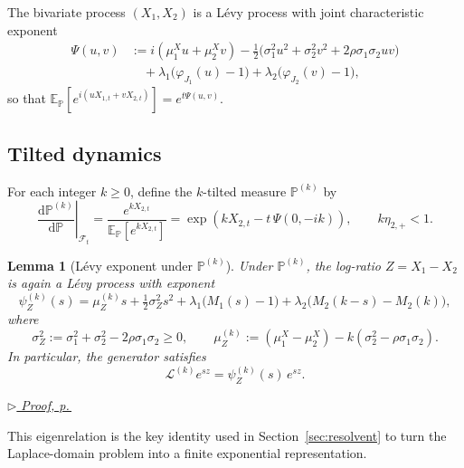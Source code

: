 \documentclass[11pt]{article}
\newcommand{\proofref}[1]{%
  \par\noindent\hfill{\small\itshape\hyperref[#1]{$\triangleright$ Proof, p.\,\pageref{#1}}}}
\newcommand{\E}{\mathbb{E}}
\renewcommand{\P}{\mathbb{P}}
\newcommand{\diff}{\mathrm{d}}
\newcommand{\F}{\mathcal{F}}
\theoremstyle{plain}
\newtheorem{lemma}[theorem]{Lemma}
\theoremstyle{definition}
\theoremstyle{remark}
\begin{document}
The bivariate process $(X_1,X_2)$ is a L\'evy process with joint characteristic exponent
\begin{equation}\label{eq:Psi}
\begin{aligned}
\Psi(u,v)
&:= i(\mu_1^X u+\mu_2^X v)
-\tfrac12\Big(\sigma_1^2u^2+\sigma_2^2v^2+2\rho\sigma_1\sigma_2uv\Big)\\
&\quad +\lambda_1\big(\varphi_{J_1}(u)-1\big)
+\lambda_2\big(\varphi_{J_2}(v)-1\big),
\end{aligned}
\end{equation}
so that $\E_\P[e^{i(uX_{1,t}+vX_{2,t})}]=e^{t\Psi(u,v)}$.

\subsection{Tilted dynamics}\label{sec:tilted}

For each integer $k\ge 0$, define the $k$-tilted measure $\P^{(k)}$ by
\[
\left.\frac{\diff\P^{(k)}}{\diff\P}\right|_{\F_t}
=
\frac{e^{kX_{2,t}}}{\E_{\P}[e^{kX_{2,t}}]}
=
\exp\!\left(kX_{2,t}-t\,\Psi(0,-ik)\right),
\qquad
k\eta_{2,+}<1.
\]
\begin{lemma}[Lévy exponent under $\P^{(k)}$]\label{lem:psiZk}
Under $\P^{(k)}$, the log-ratio $Z=X_1-X_2$ is again a Lévy process with exponent
\begin{equation}\label{eq:psiZk}
\psi_Z^{(k)}(s)
=
\mu_Z^{(k)}s+\tfrac12\sigma_Z^2 s^2
+\lambda_1\big(M_1(s)-1\big)
+\lambda_2\big(M_2(k-s)-M_2(k)\big),
\end{equation}
where
\[
\sigma_Z^2:=\sigma_1^2+\sigma_2^2-2\rho\sigma_1\sigma_2\ge 0,
\qquad
\mu_Z^{(k)}:=(\mu_1^X-\mu_2^X)-k(\sigma_2^2-\rho\sigma_1\sigma_2).
\]
In particular, the generator satisfies
\begin{equation}\label{eq:generator-eigen}
\mathcal{L}^{(k)}e^{sz}=\psi_Z^{(k)}(s)\,e^{sz}.
\end{equation}
\end{lemma}
\proofref{proof:lem:psiZk}

This eigenrelation is the key identity used in Section~\ref{sec:resolvent} to turn the
Laplace-domain problem into a finite exponential representation.
\end{document}
